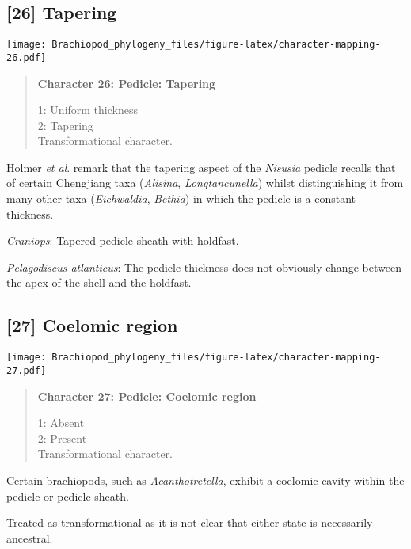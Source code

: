\documentclass[openany]{book}
\theoremstyle{definition}
\theoremstyle{definition}
\theoremstyle{definition}
\theoremstyle{remark}
\begin{document}
\subsection*{{[}26{]} Tapering}\label{tapering}

\texttt{[image: Brachiopod\_phylogeny\_files/figure-latex/character-mapping-26.pdf]}

\begin{quote}
\textbf{Character 26: Pedicle: Tapering}

1: Uniform thickness\\
2: Tapering\\
Transformational character.
\end{quote}

Holmer \emph{et al}. \citeyearpar{Holmer2018Theattachment} remark that
the tapering aspect of the \emph{Nisusia} pedicle recalls that of
certain Chengjiang taxa (\emph{Alisina}, \emph{Longtancunella}) whilst
distinguishing it from many other taxa (\emph{Eichwaldia},
\emph{Bethia}) in which the pedicle is a constant thickness.

\hypertarget{Craniops-coding-26}{}
\emph{Craniops}: Tapered pedicle sheath with holdfast.

\hypertarget{Pelagodiscus_atlanticus-coding-26}{}
\emph{Pelagodiscus atlanticus}: The pedicle thickness does not obviously
change between the apex of the shell and the holdfast.

\subsection*{{[}27{]} Coelomic region}\label{coelomic-region}

\texttt{[image: Brachiopod\_phylogeny\_files/figure-latex/character-mapping-27.pdf]}

\begin{quote}
\textbf{Character 27: Pedicle: Coelomic region}

1: Absent\\
2: Present\\
Transformational character.
\end{quote}

Certain brachiopods, such as \emph{Acanthotretella}, exhibit a coelomic
cavity within the pedicle or pedicle sheath.

Treated as transformational as it is not clear that either state is
necessarily ancestral.
\end{document}

